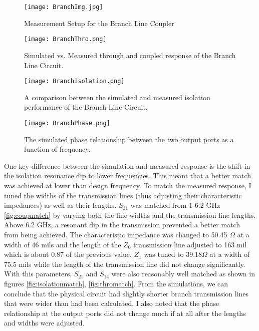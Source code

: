 \documentclass[twocolumn, aps, apl]{revtex4-1}
\begin{document}
\begin{figure}[!htbp]
    \centering
    \texttt{[image: BranchImg.jpg]}
    \caption{Measurement Setup for the Branch Line Coupler}
    \label{fig:branchimg}
\end{figure}

\begin{figure}[!htbp]
    \centering
    \texttt{[image: BranchThro.png]}
    \caption{Simulated vs. Measured through and coupled response of the Branch Line Circuit. }
    \label{fig:branchthro}
\end{figure}

\begin{figure}[!htbp]
    \centering
    \texttt{[image: BranchIsolation.png]}
    \caption{A comparison between the simulated and measured isolation performance of the Branch Line Circuit.}
    \label{fig:branchiso}
\end{figure}


\begin{figure}[!htbp]
    \centering
    \texttt{[image: BranchPhase.png]}
    \caption{The simulated phase relationship between the two output ports as a function of frequency.}
    \label{fig:branchphase}
\end{figure}

One key difference between the simulation and measured response is the shift in the isolation resonance dip to lower frequencies. This meant that a better match was achieved at lower than design frequency. To match the measured response, I tuned the widths of the transmission lines (thus adjusting their characteristic impedances) as well as their lengths. $S_{31}$ was matched from 1-6.2 GHz \ref{fig:coupmatch} by varying both the line widths and the transmission line lengths. Above 6.2 GHz, a resonant dip in the transmission prevented a better match from being achieved. The characteristic impedance was changed to 50.45 $\Omega$ at a width of 46 mils and the length of the $Z_0$ transmission line adjusted to 163 mil which is about 0.87 of the previous value. $Z_1$ was tuned to $39.18 \Omega$ at a width of 75.5 mils while the length of the transmission line did not change significantly. With this parameters, $S_{21}$ and $S_{14}$ were also reasonably well matched as shown in figures \ref{fig:isolationmatch}, \ref{fig:thromatch}. From the simulations, we can conclude that the physical circuit had slightly shorter branch transmission lines that were wider than had been calculated. I also noted that the phase relationship at the output ports did not change much if at all after the lengths and widths were adjusted.
\end{document}

